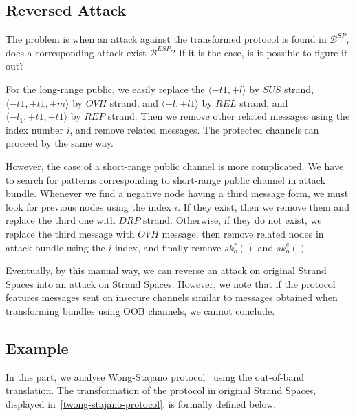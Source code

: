 \subsection{Reversed Attack}\label{reverse}

The problem is when an attack against the transformed protocol is found in $\mathcal{B}^{SP}$, does a corresponding attack exist $\mathcal{B}^{ESP}$? If it is the case, is it possible to figure it out? 

For the long-range public, we easily replace the $\langle -t1, +l \rangle $ by $SUS$ strand, $\langle -t1,+t1,+m \rangle$ by $OVH$ strand, and $ \langle -l,+l1\rangle$ by $REL$ strand, and $ \langle -l_1, +t1,+t1 \rangle$ by $REP$ strand. Then we remove other related messages using the index number $i$, and remove related messages. The protected channels can proceed by the same way. 

However, the case of a short-range public channel is more complicated. We have to search for patterns corresponding to short-range public channel in attack bundle. Whenever we find a negative node having a third message form, we must look for previous nodes using the index $i$. If they exist, then we remove them and replace the third one with $DRP$ strand. Otherwise, if they do not exist, we replace the third message with $OVH$ message, then remove related nodes in attack bundle using the $i$ index, and finally remove $sk^r_o()$ and $sk^e_o()$.

Eventually, by this manual way, we can reverse an attack on original Strand Spaces into an attack on Strand Spaces. However, we note that if the protocol features messages sent on insecure channels similar to messages obtained when transforming bundles using OOB channels, we cannot conclude. 

\subsection{Example}

In this part, we analyse Wong-Stajano protocol~\cite{10.1109/MPRV.2007.76} using the out-of-band translation. The transformation of the protocol in original Strand Spaces, displayed in~\ref{twong-stajano-protocol}, is formally defined below. 

